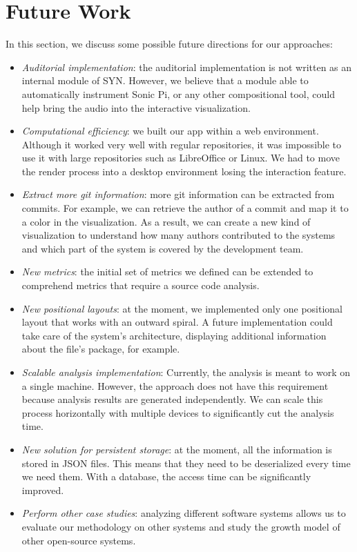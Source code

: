 \section{Future Work}
In this section, we discuss some possible future directions for our approaches:
\begin{itemize}
    \item \textit{Auditorial implementation}: the auditorial implementation is not written as an internal module of SYN. However, we believe that a module able to automatically instrument Sonic Pi, or any other compositional tool, could help bring the audio into the interactive visualization. 
    \item \textit{Computational efficiency}: we built our app within a web environment. Although it worked very well with regular repositories, it was impossible to use it with large repositories such as LibreOffice or Linux. We had to move the render process into a desktop environment losing the interaction feature.
    \item \textit{Extract more git information}: more git information can be extracted from commits. For example, we can retrieve the author of a commit and map it to a color in the visualization. As a result, we can create a new kind of visualization to understand how many authors contributed to the systems and which part of the system is covered by the development team. 
    \item \textit{New metrics}: the initial set of metrics we defined can be extended to comprehend metrics that require a source code analysis.
    \item \textit{New positional layouts}: at the moment, we implemented only one positional layout that works with an outward spiral. A future implementation could take care of the system's architecture, displaying additional information about the file's package, for example.
    \item \textit{Scalable analysis implementation}: Currently, the analysis is meant to work on a single machine. However, the approach does not have this requirement because analysis results are generated independently. We can scale this process horizontally with multiple devices to significantly cut the analysis time. 
    \item \textit{New solution for persistent storage}: at the moment, all the information is stored in JSON files. This means that they need to be deserialized every time we need them. With a database, the access time can be significantly improved.
    \item \textit{Perform other case studies}: analyzing different software systems allows us to evaluate our methodology on other systems and study the growth model of other open-source systems. 
\end{itemize}

